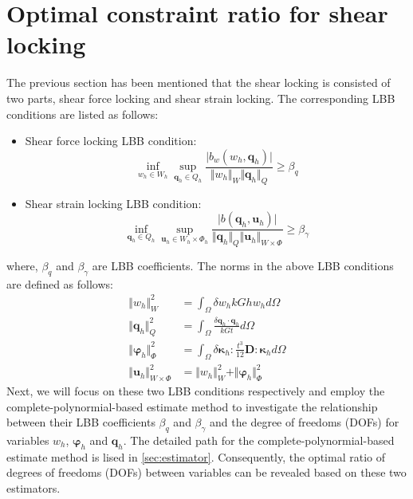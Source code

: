 \section{Optimal constraint ratio for shear locking}
The previous section has been mentioned that the shear locking is consisted of two parts, shear force locking and shear strain locking.
The corresponding LBB conditions are listed as follows:
\begin{itemize}
    \item Shear force locking LBB condition:
        \begin{equation}\label{eq:LBB_q}
        \inf_{w_h\in W_h} \sup_{\boldsymbol q_h \in Q_h} \frac{\vert b_w(w_h,\boldsymbol q_h)\vert}{\Vert w_h\Vert_W \Vert \boldsymbol q_h \Vert_Q} \ge \beta_q
        \end{equation}
    \item Shear strain locking LBB condition:
        \begin{equation}\label{eq:LBB_gamma}
        \inf_{\boldsymbol q_h \in Q_h} \sup_{\boldsymbol u_h \in W_h \times \Phi_h}
        \frac{\vert b(\boldsymbol q_h, \boldsymbol u_h) \vert}{\Vert \boldsymbol q_h \Vert_Q \Vert \boldsymbol u_h \Vert_{W\times \Phi}} \ge \beta_\gamma
        \end{equation}
\end{itemize}
where, $\beta_q$ and $\beta_\gamma$ are LBB coefficients. The norms in the above LBB conditions are defined as follows:
\begin{align}
\Vert w_h \Vert_W^2 &= \int_\Omega \delta w_h kGh  w_h d\Omega \\
\Vert \boldsymbol q_h \Vert_Q^2 &= 
\int_\Omega \frac{\delta \boldsymbol q_h \cdot \boldsymbol q_h}{kGt} d\Omega \\
\Vert \boldsymbol \varphi_h \Vert_\Phi^2 &= 
\int_\Omega \delta \boldsymbol \kappa_h : \frac{t^3}{12} \boldsymbol D : \boldsymbol \kappa_h d\Omega \\
\Vert \boldsymbol u_h \Vert_{W\times\Phi}^2 &= 
\Vert w_h \Vert_W^2 + \Vert \boldsymbol \varphi_h \Vert_\Phi^2
\end{align}
Next, we will focus on these two LBB conditions respectively and employ the complete-polynormial-based estimate method \cite{wu2026} to investigate the relationship between their LBB coefficients $\beta_q$ and $\beta_\gamma$ and the degree of freedoms (DOFs) for variables $w_h$, $\boldsymbol \varphi_h$ and $\boldsymbol q_h$.
The detailed path for the complete-polynormial-based estimate method is lised in \ref{sec:estimator}.
Consequently, the optimal ratio of degrees of freedoms (DOFs) between variables can be revealed based on these two estimators.

